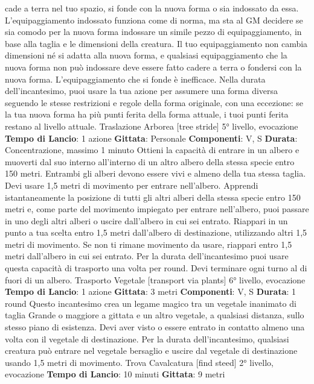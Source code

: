 \begin{multicols}{2}
cade a terra nel tuo spazio, si fonde con la nuova forma
o sia indossato da essa. L’equipaggiamento indossato
funziona come di norma, ma sta al GM decidere se sia
comodo per la nuova forma indossare un simile pezzo
di equipaggiamento, in base alla taglia e le dimensioni
della creatura. Il tuo equipaggiamento non cambia
dimensioni né si adatta alla nuova forma, e qualsiasi
equipaggiamento che la nuova forma non può
indossare deve essere fatto cadere a terra o fondersi
con la nuova forma. L’equipaggiamento che si fonde è
inefficace.
Nella durata dell’incantesimo, puoi usare la tua azione
per assumere una forma diversa seguendo le stesse
restrizioni e regole della forma originale, con una
eccezione: se la tua nuova forma ha più punti ferita
della forma attuale, i tuoi punti ferita restano al livello
attuale.
Traslazione Arborea
[tree stride]
5° livello, evocazione
\textbf{Tempo di Lancio}: 1 azione
\textbf{Gittata}: Personale
\textbf{Componenti}: V, S
\textbf{Durata}: Concentrazione, massimo 1 minuto
Ottieni la capacità di entrare in un albero e muoverti dal
suo interno all’interno di un altro albero della stessa
specie entro 150 metri. Entrambi gli alberi devono
essere vivi e almeno della tua stessa taglia. Devi usare
1,5 metri di movimento per entrare nell’albero. Apprendi
istantaneamente la posizione di tutti gli altri alberi della
stessa specie entro 150 metri e, come parte del
movimento impiegato per entrare nell’albero, puoi
passare in uno degli altri alberi o uscire dall’albero in cui
sei entrato. Riappari in un punto a tua scelta entro 1,5
metri dall’albero di destinazione, utilizzando altri 1,5
metri di movimento. Se non ti rimane movimento da
usare, riappari entro 1,5 metri dall’albero in cui sei
entrato.
Per la durata dell’incantesimo puoi usare questa
capacità di trasporto una volta per round. Devi
terminare ogni turno al di fuori di un albero.
Trasporto Vegetale
[transport via plants]
6° livello, evocazione
\textbf{Tempo di Lancio}: 1 azione
\textbf{Gittata}: 3 metri
\textbf{Componenti}: V, S
\textbf{Durata}: 1 round
Questo incantesimo crea un legame magico tra un
vegetale inanimato di taglia Grande o maggiore a
gittata e un altro vegetale, a qualsiasi distanza, sullo
stesso piano di esistenza. Devi aver visto o essere
entrato in contatto almeno una volta con il vegetale di
destinazione. Per la durata dell’incantesimo, qualsiasi
creatura può entrare nel vegetale bersaglio e uscire dal
vegetale di destinazione usando 1,5 metri di
movimento.
Trova Cavalcatura
[find steed]
2° livello, evocazione
\textbf{Tempo di Lancio}: 10 minuti
\textbf{Gittata}: 9 metri

\end{multicols}

